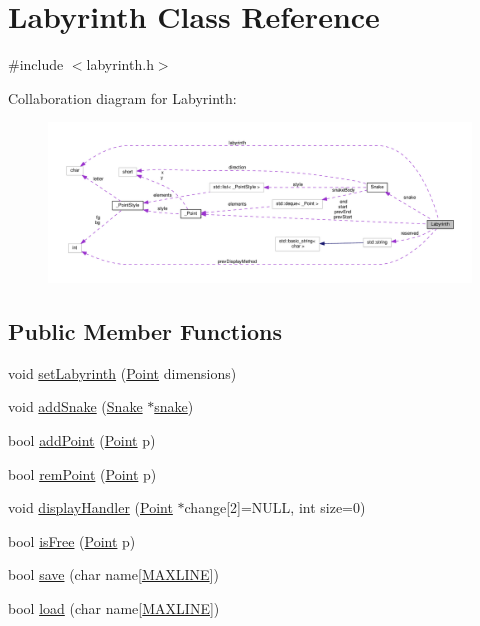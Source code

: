 \hypertarget{class_labyrinth}{\section{Labyrinth Class Reference}
\label{class_labyrinth}
}


{\ttfamily \#include $<$labyrinth.\-h$>$}



Collaboration diagram for Labyrinth\-:
\nopagebreak
\begin{figure}[H]
\begin{center}
\leavevmode
\includegraphics[width=350pt]{class_labyrinth__coll__graph}
\end{center}
\end{figure}
\subsection*{Public Member Functions}
\begin{DoxyCompactItemize}
\item 
void \hyperlink{class_labyrinth_a39e1b11a06d126328131d387fbf51d73}{set\-Labyrinth} (\hyperlink{common_8h_aa9cfdb80b4ca12013a2de8a3b9b97981}{Point} dimensions)
\item 
void \hyperlink{class_labyrinth_ad2819aba76d079c7fda751e7388b7182}{add\-Snake} (\hyperlink{class_snake}{Snake} $\ast$\hyperlink{class_labyrinth_a09a46368bfd83ccb75580687cb17b92f}{snake})
\item 
bool \hyperlink{class_labyrinth_a710cf4ff7789d527e6081d1eb2d696a6}{add\-Point} (\hyperlink{common_8h_aa9cfdb80b4ca12013a2de8a3b9b97981}{Point} p)
\item 
bool \hyperlink{class_labyrinth_a24d98083c011da23695425ec69d583a5}{rem\-Point} (\hyperlink{common_8h_aa9cfdb80b4ca12013a2de8a3b9b97981}{Point} p)
\item 
void \hyperlink{class_labyrinth_a02c42abb1b58fdf8a20b66bddd0bbe00}{display\-Handler} (\hyperlink{common_8h_aa9cfdb80b4ca12013a2de8a3b9b97981}{Point} $\ast$change\mbox{[}2\mbox{]}=N\-U\-L\-L, int size=0)
\item 
bool \hyperlink{class_labyrinth_acd7311e3222304bae2208fbc293bcc4d}{is\-Free} (\hyperlink{common_8h_aa9cfdb80b4ca12013a2de8a3b9b97981}{Point} p)
\item 
bool \hyperlink{class_labyrinth_a99e6b33f94d6d64f9c5a4fa78f08c007}{save} (char name\mbox{[}\hyperlink{common_8h_a3e937c42922f7601edb17b747602c471}{M\-A\-X\-L\-I\-N\-E}\mbox{]})
\item 
bool \hyperlink{class_labyrinth_a36cd7033292515cba0ce3d74f03720b6}{load} (char name\mbox{[}\hyperlink{common_8h_a3e937c42922f7601edb17b747602c471}{M\-A\-X\-L\-I\-N\-E}\mbox{]})
\end{DoxyCompactItemize}
